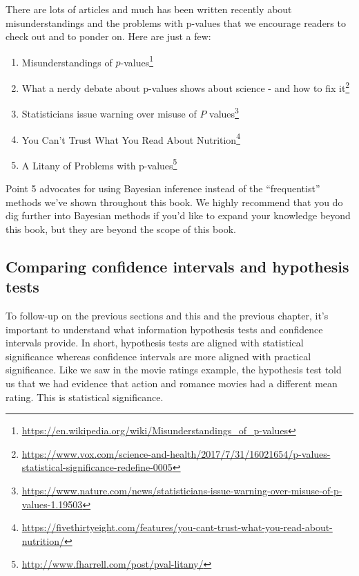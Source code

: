 \documentclass[12pt, krantz2,]{krantz}
\providecommand{\tightlist}{%
  \setlength{\itemsep}{0pt}\setlength{\parskip}{0pt}}
\renewcommand{\href}[2]{#2\footnote{\url{#1}}}
\begin{document}
There are lots of articles and much has been written recently about misunderstandings and the problems with p-values that we encourage readers to check out and to ponder on. Here are just a few:

\begin{enumerate}
\def\labelenumi{\arabic{enumi}.}
\tightlist
\item
  \href{https://en.wikipedia.org/wiki/Misunderstandings_of_p-values}{Misunderstandings of \(p\)-values}
\item
  \href{https://www.vox.com/science-and-health/2017/7/31/16021654/p-values-statistical-significance-redefine-0005}{What a nerdy debate about p-values shows about science - and how to fix it}
\item
  \href{https://www.nature.com/news/statisticians-issue-warning-over-misuse-of-p-values-1.19503}{Statisticians issue warning over misuse of \(P\) values}
\item
  \href{https://fivethirtyeight.com/features/you-cant-trust-what-you-read-about-nutrition/}{You Can't Trust What You Read About Nutrition}
\item
  \href{http://www.fharrell.com/post/pval-litany/}{A Litany of Problems with p-values}
\end{enumerate}

Point 5 advocates for using Bayesian inference instead of the ``frequentist'' methods we've shown throughout this book. We highly recommend that you do dig further into Bayesian methods if you'd like to expand your knowledge beyond this book, but they are beyond the scope of this book.

\hypertarget{comparing-confidence-intervals-and-hypothesis-tests}{%
\subsection{Comparing confidence intervals and hypothesis tests}\label{comparing-confidence-intervals-and-hypothesis-tests}}

To follow-up on the previous sections and this and the previous chapter, it's important to understand what information hypothesis tests and confidence intervals provide. In short, hypothesis tests are aligned with statistical significance whereas confidence intervals are more aligned with practical significance. Like we saw in the movie ratings example, the hypothesis test told us that we had evidence that action and romance movies had a different mean rating. This is statistical significance.
\end{document}
